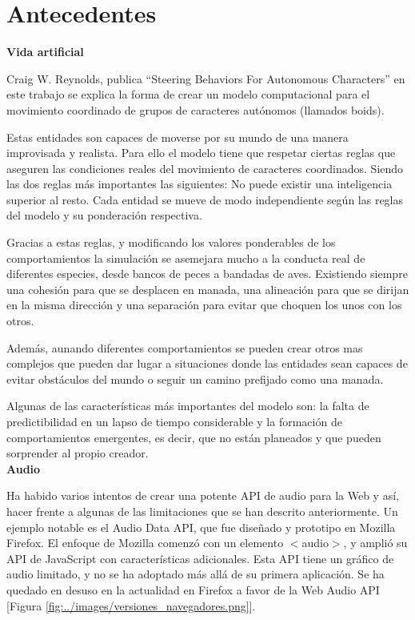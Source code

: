 \section{Antecedentes}
\label{section:antecedentes}
\noindent\textbf{Vida artificial}

Craig W. Reynolds, publica “Steering Behaviors For Autonomous Characters” en este trabajo se explica la forma de crear un modelo computacional para el movimiento 
coordinado de grupos de caracteres autónomos (llamados boids).
 
Estas entidades son capaces de moverse por su mundo de una manera improvisada y realista. Para ello el modelo tiene que respetar ciertas reglas que aseguren las condiciones reales 
del movimiento de caracteres coordinados. Siendo las dos reglas más importantes las siguientes:
No puede existir una inteligencia superior al resto.
Cada entidad se mueve de modo independiente según las reglas del modelo y su ponderación respectiva.
 
Gracias a estas reglas, y modificando los valores ponderables de los comportamientos la simulación se asemejara mucho a la conducta real de diferentes especies, desde bancos de 
peces a bandadas de aves. Existiendo siempre una cohesión para que se desplacen en manada, una alineación para que se dirijan en la misma dirección y una separación para evitar que
choquen los unos con los otros.
 
Además, aunando diferentes comportamientos se pueden crear otros mas complejos que pueden dar lugar a situaciones donde las entidades sean capaces de evitar obstáculos del mundo o 
seguir un camino prefijado como una manada.
 
Algunas de las características más importantes del modelo son: la falta de predictibilidad en un lapso de tiempo considerable y la formación de comportamientos emergentes, es decir, 
que no están planeados y que pueden sorprender al propio creador.\\

\noindent\textbf{Audio}

Ha habido varios intentos de crear una potente API de audio para la Web y así,  hacer frente a algunas de las limitaciones que se han descrito anteriormente.  Un ejemplo notable es el Audio Data API,  que fue diseñado y prototipo en Mozilla Firefox.  El enfoque de Mozilla comenzó con un elemento $<$audio$>$, y amplió su API de JavaScript con características adicionales. Esta API tiene un gráfico de audio limitado, y no se ha adoptado más allá de su primera aplicación. Se ha quedado en desuso en la actualidad en Firefox a favor de la Web Audio API [Figura \ref{fig:../images/versiones_navegadores.png}].

